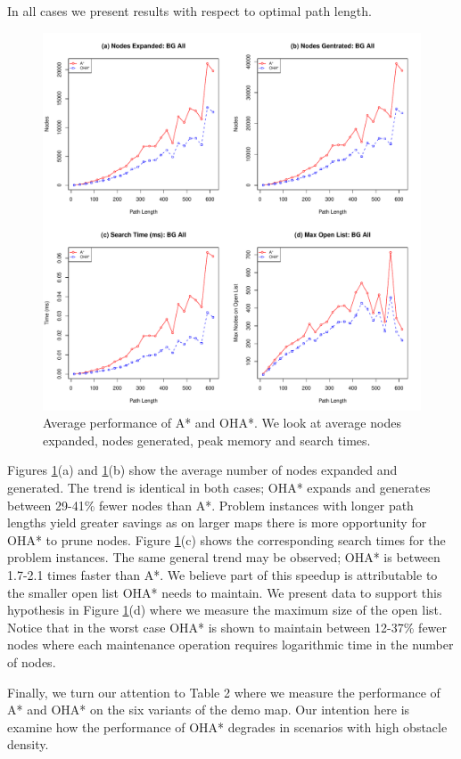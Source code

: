 In all cases we present results with respect to optimal path length.
\begin{figure}[t]
	\begin{center}
		       \includegraphics[width=0.95\columnwidth, trim = 20mm 17mm 20mm 5mm]{diagrams/bg_effort.pdf}
	\end{center}
	\caption{Average performance of A* and OHA*. We look at average nodes expanded, nodes generated,
	peak memory and search times.}
	\label{fig-searcheffort}
\end{figure}
\par \indent
Figures \ref{fig-searcheffort}(a) and \ref{fig-searcheffort}(b)  show the average number of 
nodes expanded and generated. 
The trend is identical in both cases; OHA* expands and generates between 29-41\% fewer nodes than A*.
Problem instances with longer path lengths yield greater savings as on larger maps there is more 
opportunity for OHA* to prune nodes. 
Figure \ref{fig-searcheffort}(c) shows the corresponding search times for the problem instances. 
The same general trend may be observed; OHA* is between 1.7-2.1 times faster than A*.
We believe part of this speedup is attributable to the smaller open list OHA* needs to maintain.
We present data to support this hypothesis in Figure \ref{fig-searcheffort}(d) where we measure 
the maximum size of the open list. 
Notice that in the worst case OHA* is shown to maintain between 12-37\% fewer nodes where each
maintenance operation requires logarithmic time in the number of nodes.
\par
Finally, we turn our attention to Table 2 where we measure the 
performance of A* and OHA* on the six variants of the demo map.
Our intention here is examine how the performance of OHA* degrades in scenarios with
high obstacle density.


